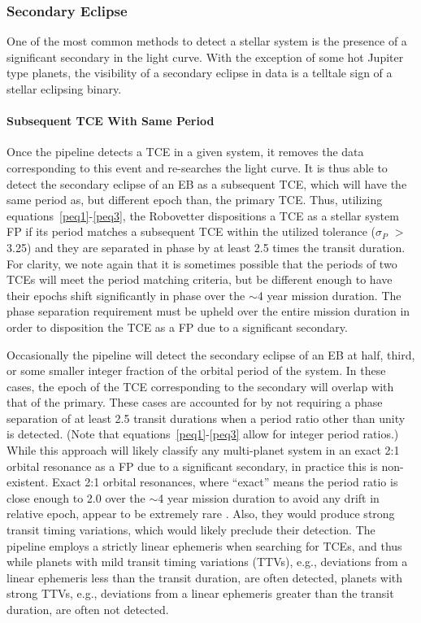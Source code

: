 \subsubsection{Secondary Eclipse}

One of the most common methods to detect a stellar system is the presence of a significant secondary in the light curve. With the exception of some hot Jupiter type planets, the visibility of a secondary eclipse in \kepler{} data is a telltale sign of a stellar eclipsing binary.


\paragraph{Subsequent TCE With Same Period}
\label{s:secondTce}
Once the \kepler{} pipeline detects a TCE in a given system, it removes the data corresponding to this event and re-searches the light curve. It is thus able to detect the secondary eclipse of an EB as a subsequent TCE, which will have the same period as, but different epoch than, the primary TCE. Thus, utilizing equations~\ref{peq1}-\ref{peq3}, the Robovetter dispositions a TCE as a stellar system FP if its period matches a subsequent TCE within the utilized tolerance ($\sigma_{P}$ $>$ 3.25) and they are separated in phase by at least 2.5 times the transit duration. For clarity, we note again that it is sometimes possible that the periods of two TCEs will meet the period matching criteria, but be different enough to have their epochs shift significantly in phase over the $\sim$4 year mission duration. The phase separation requirement must be upheld over the entire mission duration in order to disposition the TCE as a FP due to a significant secondary.  

Occasionally the \kepler{} pipeline will detect the secondary eclipse of an EB at half, third, or some smaller integer fraction of the orbital period of the system. In these cases, the epoch of the TCE corresponding to the secondary will overlap with that of the primary. These cases are accounted for by not requiring a phase separation of at least 2.5 transit durations when a period ratio other than unity is detected. (Note that equations~\ref{peq1}-\ref{peq3} allow for integer period ratios.) While this approach will likely classify any multi-planet system in an exact 2:1 orbital resonance as a FP due to a significant secondary, in practice this is non-existent. Exact 2:1 orbital resonances, where ``exact'' means the period ratio is close enough to 2.0 over the $\sim$4 year mission duration to avoid any drift in relative epoch, appear to be extremely rare \citep{Fabrycky2014}. Also, they would produce strong transit timing variations, which would likely preclude their detection. The \kepler{} pipeline employs a strictly linear ephemeris when searching for TCEs, and thus while planets with mild transit timing variations (TTVs), e.g., deviations from a linear ephemeris less than the transit duration, are often detected, planets with strong TTVs, e.g., deviations from a linear ephemeris greater than the transit duration, are often not detected.



